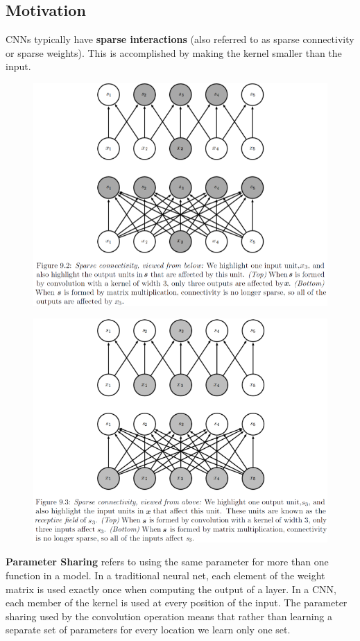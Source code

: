 \begin{multicols}{2}
	\subsection{Motivation}
	CNNs typically have \textbf{sparse interactions} (also referred to as sparse connectivity or sparse weights).
	This is accomplished by making the kernel smaller than the input.
	\begin{figure}[H]
		\centering
		\includegraphics[width=0.85\linewidth]{images/sparse1.png}
	\end{figure}
	\begin{figure}[H]
		\centering
		\includegraphics[width=0.85\linewidth]{images/sparse2.png}
	\end{figure}
	
	\textbf{Parameter Sharing} refers to using the same parameter for more than one function in a model.
	In a traditional neural net, each element of the weight matrix is used exactly once when computing the output of a layer.
	In a CNN, each member of the kernel is used at every position of the input.
	The parameter sharing used by the convolution operation means that rather than learning a separate set of parameters for every location we learn only one set.\\
	

\end{multicols}
